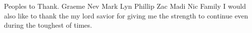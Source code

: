Peoples to Thank.
Graeme
Nev
Mark
Lyn
Phillip
Zac
Madi
Nic
Family
I would also like to thank the my lord savior for giving me the strength to continue even during the toughest of times.

